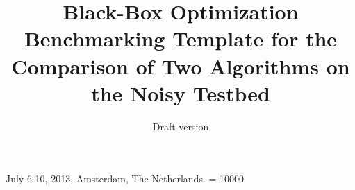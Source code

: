 \documentclass{sig-alternate}
\begin{document}
%
 {July 6-10, 2013, Amsterdam, The Netherlands.}
\widowpenalty = 10000

\title{Black-Box Optimization Benchmarking Template for the Comparison of Two Algorithms on the Noisy Testbed}
\subtitle{Draft version
}

%
%
%
%
%
\end{document}
